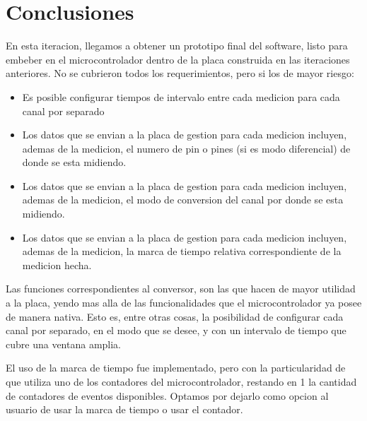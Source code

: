 
\section{Conclusiones} %
\label{sec:conclusiones}

En esta iteracion, llegamos a obtener un prototipo final del software, listo para embeber en el microcontrolador dentro de la placa construida en las iteraciones anteriores. No se cubrieron todos los requerimientos, pero si los de mayor riesgo:

\begin{itemize}
\item Es posible configurar tiempos de intervalo entre cada medicion para cada canal por separado
\item Los datos que se envian a la placa de gestion para cada medicion incluyen, ademas de la medicion, el numero de pin o pines (si es modo diferencial) de donde se esta midiendo. 
\item Los datos que se envian a la placa de gestion para cada medicion incluyen, ademas de la medicion, el modo de conversion del canal por donde se esta midiendo.
\item Los datos que se envian a la placa de gestion para cada medicion incluyen, ademas de la medicion, la marca de tiempo relativa correspondiente de la medicion hecha. 
\end{itemize}

Las funciones correspondientes al conversor, son las que hacen de mayor utilidad a la placa, yendo mas alla de las funcionalidades que el microcontrolador ya posee de manera nativa. Esto es, entre otras cosas, la posibilidad de configurar cada canal por separado, en el modo que se desee, y con un intervalo de tiempo que cubre una ventana amplia.

El uso de la marca de tiempo fue implementado, pero con la particularidad de que utiliza uno de los contadores del microcontrolador, restando en 1 la cantidad de contadores de eventos disponibles. Optamos por dejarlo como opcion al usuario de usar la marca de tiempo o usar el contador.



